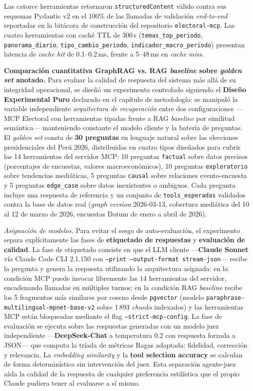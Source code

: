 Las catorce herramientas retornaron \texttt{structuredContent} válido contra
sus esquemas Pydantic v2 en el 100\% de las llamadas de validación
\textit{end-to-end} reportadas en la bitácora de construcción del repositorio
\texttt{electoral-mcp}. Las cuatro herramientas con caché TTL de 300\,s
(\texttt{temas\_top\_periodo}, \texttt{panorama\_diario},
\texttt{tipo\_cambio\_periodo}, \texttt{indicador\_macro\_periodo}) presentan
latencia de \textit{cache hit} de 0.1--0.2\,ms, frente a 5--48\,ms en
\textit{cache miss}.

\textbf{Comparación cuantitativa GraphRAG vs. RAG \textit{baseline} sobre
\textit{golden set} anotado.} Para evaluar la calidad de respuesta del
sistema más allá de su integridad operacional, se diseñó un experimento
controlado siguiendo el \textbf{Diseño Experimental Puro} declarado en el
capítulo de metodología: se manipuló la variable independiente
\textit{arquitectura de recuperación} entre dos configuraciones —MCP
Electoral con herramientas tipadas frente a RAG \textit{baseline} por
similitud semántica— manteniendo constante el modelo cliente y la batería
de preguntas. El \textit{golden set} consta de \textbf{30 preguntas} en
lenguaje natural sobre las elecciones presidenciales del Perú 2026,
distribuidas en cuatro tipos diseñados para cubrir las 14 herramientas del
servidor MCP: 10 preguntas \texttt{factual} sobre datos precisos
(porcentajes de encuestas, valores macroeconómicos), 10 preguntas
\texttt{exploratorio} sobre tendencias mediáticas, 5 preguntas
\texttt{causal} sobre relaciones evento-encuesta y 5 preguntas
\texttt{edge\_case} sobre datos inexistentes o ambiguos. Cada pregunta
incluye una respuesta de referencia y un conjunto de
\texttt{tools\_esperadas} validados contra la base de datos real
(\textit{graph version} 2026-03-13, cobertura mediática del 10 al 12 de
marzo de 2026, encuestas Datum de enero a abril de 2026).

\textit{Asignación de modelos.} Para evitar el sesgo de auto-evaluación, el
experimento separa explícitamente las fases de \textbf{etiquetado de
respuestas} y \textbf{evaluación de calidad}. La fase de etiquetado consiste
en que el LLM cliente —\textbf{Claude Sonnet} vía Claude Code CLI 2.1.150
con \texttt{--print --output-format stream-json}— recibe la pregunta y
genera la respuesta utilizando la arquitectura asignada: en la condición MCP
puede invocar libremente las 14 herramientas del servidor, encadenando
llamadas en múltiples turnos; en la condición RAG \textit{baseline} recibe
los 5 fragmentos más similares por coseno desde \texttt{pgvector} (modelo
\texttt{paraphrase-multilingual-mpnet-base-v2} sobre 1\,893 \textit{chunks}
indexados) y las herramientas MCP están bloqueadas mediante el flag
\texttt{--strict-mcp-config}. La fase de evaluación se ejecuta sobre las
respuestas generadas con un modelo juez independiente —\textbf{DeepSeek-Chat}
a temperatura 0.2 con respuesta forzada a JSON— que computa la tríada de
métricas Ragas adaptada: fidelidad, corrección y relevancia. La
\textit{embedding similarity} y la \textbf{tool selection accuracy} se
calculan de forma determinística sin intervención del juez. Esta separación
agente-juez aísla la calidad de la respuesta de cualquier preferencia
estilística que el propio Claude pudiera tener al evaluarse a sí mismo.

